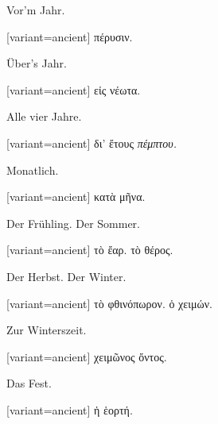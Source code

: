 Vor'm Jahr.

\switchcolumn

\begin{greek}[variant=ancient]%
πέρυσιν.

\end{greek}%
\switchcolumn*

Über's Jahr.

\switchcolumn

\begin{greek}[variant=ancient]%
εἰς νέωτα.

\end{greek}%
\switchcolumn*

Alle vier Jahre.

\switchcolumn

\begin{greek}[variant=ancient]%
δι' ἔτους \emph{πέμπτου.}

\end{greek}%
\switchcolumn*

Monatlich.

\switchcolumn

\begin{greek}[variant=ancient]%
κατὰ μῆνα.

\end{greek}%
\switchcolumn*

Der Frühling. Der Sommer.

\switchcolumn

\begin{greek}[variant=ancient]%
τὸ ἔαρ. τὸ θέρος.

\end{greek}%
\switchcolumn*

Der Herbst. Der Winter.

\switchcolumn

\begin{greek}[variant=ancient]%
τὸ φθινόπωρον. ὁ χειμών.

\end{greek}%
\switchcolumn*

Zur Winters\textcompwordmark{}zeit.

\switchcolumn

\begin{greek}[variant=ancient]%
χειμῶνος ὄντος.

\end{greek}%
\switchcolumn*

Das Fest.

\switchcolumn

\begin{greek}[variant=ancient]%
ἡ ἑορτή.

\end{greek}%
\switchcolumn*

